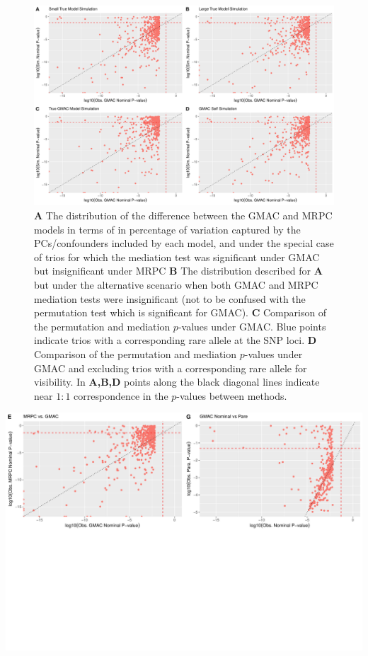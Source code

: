 \documentclass[
]{article}
\begin{document}
\begin{figure}
\centering
\includegraphics{GMACwriteup_files/figure-latex/unnamed-chunk-9-1.pdf}
\caption{\textbf{A} The distribution of the difference between the GMAC
and MRPC models in terms of in percentage of variation captured by the
PCs/confounders included by each model, and under the special case of
trios for which the mediation test was significant under GMAC but
insignificant under MRPC \textbf{B} The distribution described for
\textbf{A} but under the alternative scenario when both GMAC and MRPC
mediation tests were insignificant (not to be confused with the
permutation test which is significant for GMAC). \textbf{C} Comparison
of the permutation and mediation \(p\)-values under GMAC. Blue points
indicate trios with a corresponding rare allele at the SNP loci.
\textbf{D} Comparison of the permutation and mediation \(p\)-values
under GMAC and excluding trios with a corresponding rare allele for
visibility. In \textbf{A,B,D} points along the black diagonal lines
indicate near \(1:1\) correspondence in the \(p\)-values between
methods.}
\end{figure}

\includegraphics{GMACwriteup_files/figure-latex/unnamed-chunk-10-1.pdf}
\end{document}
